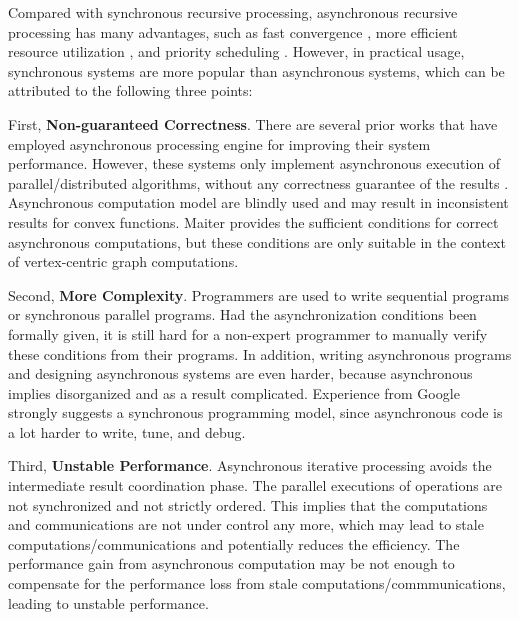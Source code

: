 Compared with synchronous recursive processing, asynchronous recursive processing has many advantages, such as fast convergence \cite{}, more efficient resource utilization \cite{}, and priority scheduling \cite{}. However, in practical usage, synchronous systems are more popular than asynchronous systems, which can be attributed to the following three points:


First, \textbf{Non-guaranteed Correctness}. There are several prior works that have employed asynchronous processing engine for improving their system performance. However, these systems only implement asynchronous execution of parallel/distributed algorithms, without any correctness guarantee of the results \cite{}. Asynchronous computation model are blindly used and may result in inconsistent results for convex functions. Maiter \cite{} provides the sufficient conditions for correct asynchronous computations, but these conditions are only suitable in the context of vertex-centric graph computations.

Second, \textbf{More Complexity}. Programmers are used to write sequential programs or synchronous parallel programs. Had the asynchronization conditions been formally given, it is still hard for a non-expert programmer to manually verify these conditions from their programs. In addition, writing asynchronous programs and designing asynchronous systems are even harder, because asynchronous implies disorganized and as a result complicated. Experience from Google \cite{} strongly suggests a synchronous programming model, since asynchronous code is a lot harder to write, tune, and debug.

{\color{red}
Third, \textbf{Unstable Performance}. Asynchronous iterative processing avoids the intermediate result coordination phase. The parallel executions of operations are not synchronized and not strictly ordered. This implies that the computations and communications are not under control any more, which may lead to stale computations/communications and potentially reduces the efficiency. The performance gain from asynchronous computation may be not enough to compensate for the performance loss from stale computations/commmunications, leading to unstable performance.
}

